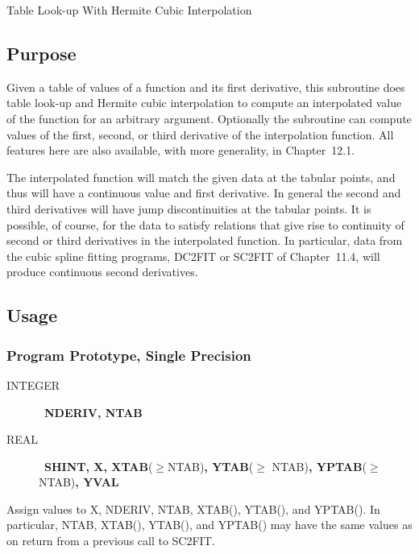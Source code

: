 \documentclass[twoside]{MATH77}
\begin{document}
 Table Look-up With Hermite Cubic Interpolation


\subsection{Purpose}

Given a table of values of a function and its first derivative, this
subroutine does table look-up and Hermite cubic interpolation to compute an
interpolated value of the function for an arbitrary argument. Optionally the
subroutine can compute values of the first, second, or third derivative of
the interpolation function.  All features here are also available,
with more generality, in Chapter~12.1.

The interpolated function will match the given data at the tabular points,
and thus will have a continuous value and first derivative. In general the
second and third derivatives will have jump discontinuities at the tabular
points. It is possible, of course, for the data to satisfy relations that
give rise to continuity of second or third derivatives in the interpolated
function. In particular, data from the cubic spline fitting programs, DC2FIT
or SC2FIT of Chapter~11.4, will produce continuous second derivatives.

\subsection{Usage}

\subsubsection{Program Prototype, Single Precision}

\begin{description}
\item[INTEGER]  \ {\bf NDERIV, NTAB}

\item[REAL]  \ {\bf SHINT, X, XTAB}($\geq $NTAB){\bf ,\newline
YTAB}($\geq $ NTAB){\bf , YPTAB}($\geq $NTAB){\bf , YVAL}
\end{description}

Assign values to X, NDERIV, NTAB, XTAB(), YTAB(), and YPTAB(). In
particular, NTAB, XTAB(), YTAB(), and YPTAB() may have the same values as on
return from a previous call to SC2FIT.
\end{document}
